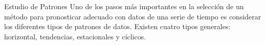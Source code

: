 \begin{frame}{Estudio de Patrones}{}
  Uno de los pasos más importantes en la selección de un método para pronosticar adecuado con datos de una serie de tiempo es considerar los diferentes \alert{tipos de patrones de datos}. Existen cuatro tipos generales: \alert{horizontal, tendencias, estacionales y cíclicos}.
\end{frame}



